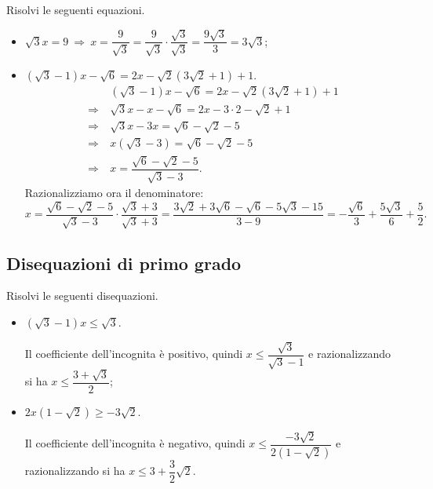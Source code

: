 \begin{exrig}
\begin{esempio}
Risolvi le seguenti equazioni.
\begin{itemize}
 \item $\sqrt 3x=9\:\Rightarrow\: x=\dfrac 9{\sqrt 3} =\dfrac 9{\sqrt 3}\cdot \dfrac{\sqrt 3}{\sqrt 3}=\dfrac{9\sqrt 3} 3=3\sqrt 3$;
 \item $(\sqrt 3-1)x-\sqrt 6=2x-\sqrt 2(3\sqrt 2+1)+1$.
 \begin{align*}
&(\sqrt 3-1)x-\sqrt 6=2x-\sqrt 2(3\sqrt 2+1)+1\\
 \Rightarrow\:&\sqrt 3x-x-\sqrt 6=2x-3\cdot 2-\sqrt 2+1\\
 \Rightarrow\:&\sqrt 3x-3x=\sqrt 6-\sqrt 2-5\\
 \Rightarrow\:&x(\sqrt 3-3)=\sqrt 6-\sqrt 2-5\\
 \Rightarrow\:&x=\dfrac{\sqrt 6-\sqrt 2-5}{\sqrt 3-3}.
 \end{align*}
Razionalizziamo ora il denominatore:
 \[x=\dfrac{\sqrt 6-\sqrt 2-5}{\sqrt 3-3}\cdot \dfrac{\sqrt 3+3}{\sqrt 3+3}=\dfrac{3\sqrt 2+3\sqrt 6-\sqrt 6-5\sqrt 3-15}{3-9}=%
 -\dfrac{\sqrt 6} 3+\dfrac{5\sqrt 3} 6+\dfrac 5 2.\]
\end{itemize}
\end{esempio}
\end{exrig}

\subsection{Disequazioni di primo grado}
\begin{exrig}
\begin{esempio}
Risolvi le seguenti disequazioni.
 \begin{itemize}
 \item $(\sqrt 3-1)x\le \sqrt 3$.

Il coefficiente dell'incognita è positivo, quindi $x\le \dfrac{\sqrt 3}{\sqrt 3-1}$ e razionalizzando si ha $x\le \dfrac{3+\sqrt 3} 2$;
 \item $2x(1-\sqrt 2)\ge -3\sqrt 2$.

Il coefficiente dell'incognita è negativo, quindi $x\le \dfrac{-3\sqrt 2}{2(1-\sqrt 2)}$ e razionalizzando si ha $x\le 3+\dfrac 3 2\sqrt 2$.
 \end{itemize}

\end{esempio}
\end{exrig}

